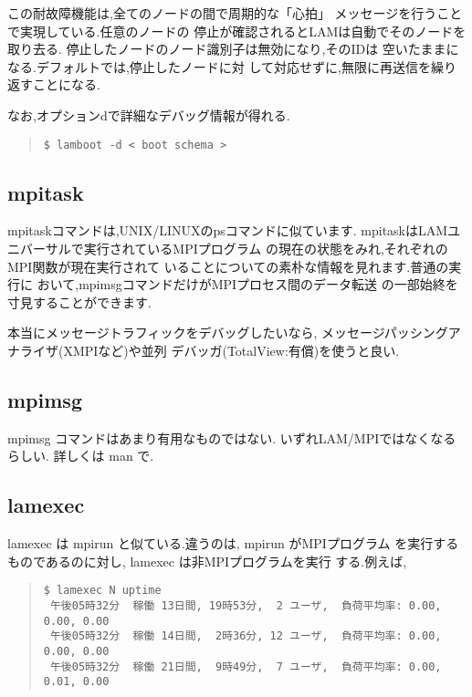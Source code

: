 \documentclass[a4paper,titlepage]{jreport}
\begin{document}
この耐故障機能は,全てのノードの間で周期的な「心拍」
メッセージを行うことで実現している.任意のノードの
停止が確認されるとLAMは自動でそのノードを取り去る.
停止したノードのノード識別子は無効になり,そのIDは
空いたままになる.デフォルトでは,停止したノードに対
して対応せずに,無限に再送信を繰り返すことになる.

なお,オプションdで詳細なデバッグ情報が得れる.

\begin{quote}
\begin{screen}
\begin{verbatim}
$ lamboot -d < boot schema >
\end{verbatim}
\end{screen}
\end{quote}

\subsection{mpitask}
mpitaskコマンドは,UNIX/LINUXのpsコマンドに似ています.
mpitaskはLAMユニバーサルで実行されているMPIプログラム
の現在の状態をみれ,それぞれのMPI関数が現在実行されて
いることについての素朴な情報を見れます.普通の実行に
おいて,mpimsgコマンドだけがMPIプロセス間のデータ転送
の一部始終を寸見することができます.

本当にメッセージトラフィックをデバッグしたいなら,
メッセージパッシングアナライザ(XMPIなど)や並列
デバッガ(TotalView:有償)を使うと良い.

\subsection{mpimsg}
mpimsg コマンドはあまり有用なものではない.
いずれLAM/MPIではなくなるらしい.
詳しくは man で.

\subsection{lamexec}
lamexec は mpirun と似ている.違うのは, mpirun がMPIプログラム
を実行するものであるのに対し, lamexec は非MPIプログラムを実行
する.例えば,

\begin{quote}
\begin{screen}
\begin{verbatim}
$ lamexec N uptime
 午後05時32分  稼働 13日間, 19時53分,  2 ユーザ,  負荷平均率: 0.00, 0.00, 0.00
 午後05時32分  稼働 14日間,  2時36分, 12 ユーザ,  負荷平均率: 0.00, 0.00, 0.00
 午後05時32分  稼働 21日間,  9時49分,  7 ユーザ,  負荷平均率: 0.00, 0.01, 0.00
\end{verbatim}
\end{screen}
\end{quote}
\end{document}

